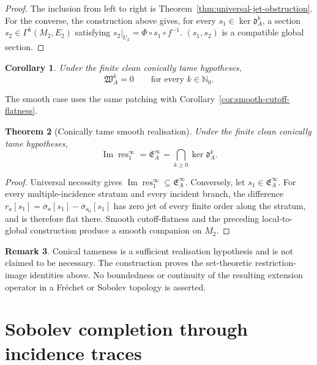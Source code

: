 \documentclass[11pt]{article}
\theoremstyle{plain}
\newtheorem{theorem}{Theorem}[section]
\newtheorem{corollary}[theorem]{Corollary}
\theoremstyle{definition}
\newtheorem{remark}[theorem]{Remark}
\begin{document}
\begin{proof}
The inclusion from left to right is
Theorem~\ref{thm:universal-jet-obstruction}.
For the converse, the construction above gives, for every
\(s_1\in\ker\mathfrak d_A^k\),
a section \(s_2\in\Gamma^k(M_2,E_2)\) satisfying
\(s_2|_{U_2} = \Phi\circ s_1\circ f^{-1}\).
\((s_1,s_2)\) is a compatible global section.
\end{proof}

\begin{corollary}
\label{cor:tame-residual-vanishing}
Under the finite clean conically tame hypotheses,
\[
  \mathfrak W_A^k=0
  \qquad
  \text{for every }k\in\mathbb N_0.
\]
\end{corollary}

The smooth case uses the same patching with Corollary~\ref{cor:smooth-cutoff-flatness}.

\begin{theorem}[Conically tame smooth realisation]
\label{thm:conically-tame-smooth-realisation}
Under the finite clean conically tame hypotheses,
\[
  \boxed{
  \operatorname{Im}\operatorname{res}_1^\infty
  =
  \mathfrak E_A^\infty
  =
  \bigcap_{k\geq0}
  \ker\mathfrak d_A^k.
  }
\]
\end{theorem}

\begin{proof}
Universal necessity gives
\(\operatorname{Im}\operatorname{res}_1^\infty \subseteq \mathfrak E_A^\infty\).
Conversely, let
\(s_1\in\mathfrak E_A^\infty\).
For every multiple-incidence stratum and every incident branch,
the difference \(r_a[s_1] = \overline{\sigma}_a[s_1] - \overline{\sigma}_{a_0}[s_1]\) has zero jet of every finite order along the stratum, and is therefore
flat there. Smooth cutoff-flatness and the preceding local-to-global
construction produce a smooth companion on \(M_2\).
\end{proof}

\begin{remark}
Conical tameness is a sufficient realisation hypothesis and is not
claimed to be necessary. The construction proves the set-theoretic
restriction-image identities above. No boundedness or continuity of
the resulting extension operator in a Fr\'echet or Sobolev topology is
asserted.
\end{remark}

\section{Sobolev completion through incidence traces}
\label{sec:sobolev-closure}
\end{document}
